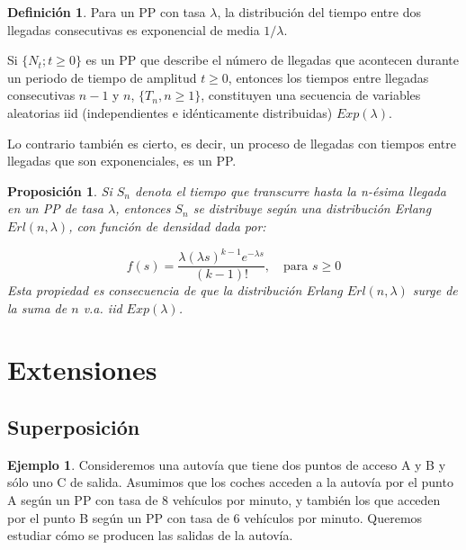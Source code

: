 \documentclass[
]{book}
\newenvironment{yellowbox}{
  \definecolor{shadecolor}{rgb}{210, 180, 140}  
  \color{black}
  \begin{shaded}}
 {\end{shaded}}
\newtheorem{proposition}{Proposición}[chapter]
\theoremstyle{definition}
\newtheorem{definition}{Definición}[chapter]
\theoremstyle{definition}
\newtheorem{example}{Ejemplo}[chapter]
\theoremstyle{definition}
\theoremstyle{definition}
\theoremstyle{remark}
\begin{document}
\begin{yellowbox}

\begin{definition}
\protect\hypertarget{def:tpollegadas}{}\label{def:tpollegadas}Para un PP con tasa \(\lambda\), la distribución del tiempo entre dos llegadas consecutivas es exponencial de media \(1/\lambda\).

Si \(\{N_t; t \geq 0\}\) es un PP que describe el número de llegadas que acontecen durante un periodo de tiempo de amplitud \(t \geq 0\), entonces los tiempos entre llegadas consecutivas \(n-1\) y \(n\), \(\{T_n, n\geq 1\}\), constituyen una secuencia de variables aleatorias iid (independientes e idénticamente distribuidas) \(Exp(\lambda)\).

Lo contrario también es cierto, es decir, un proceso de llegadas con tiempos entre llegadas que son exponenciales, es un PP.
\end{definition}

\end{yellowbox}

\begin{proposition}
Si \(S_n\) denota el tiempo que transcurre hasta la n-ésima llegada en un PP de tasa \(\lambda\), entonces \(S_n\) se distribuye según una distribución Erlang \(Erl(n,\lambda)\), con función de densidad dada por:

\[f(s) = \frac{\lambda(\lambda s)^{k-1}e^{-\lambda s}}{(k-1)!}, \quad \text{para } s \geq 0\] Esta propiedad es consecuencia de que la distribución Erlang \(Erl(n,\lambda)\) surge de la suma de \(n\) v.a. iid \(Exp(\lambda)\).
\end{proposition}

\hypertarget{extensiones_pp}{%
\section{Extensiones}\label{extensiones_pp}}

\hypertarget{superposicion_pp}{%
\subsection{Superposición}\label{superposicion_pp}}

\begin{example}
\protect\hypertarget{exm:pp002}{}\label{exm:pp002}Consideremos una autovía que tiene dos puntos de acceso A y B y sólo uno C de salida. Asumimos que los coches acceden a la autovía por el punto A según un PP con tasa de 8 vehículos por minuto, y también los que acceden por el punto B según un PP con tasa de 6 vehículos por minuto. Queremos estudiar cómo se producen las salidas de la autovía.
\end{example}
\end{document}

